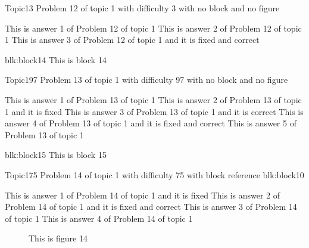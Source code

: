 \documentclass[master]{exam}
\begin{document}
\begin{problem}{Topic1}{3}
	Problem 12 of topic 1 with difficulty 3 with no block and no figure
	\begin{answers}
		\answer This is answer 1 of Problem 12 of topic 1 
		\answer This is answer 2 of Problem 12 of topic 1 
		 This is answer 3 of Problem 12 of topic 1 and it is fixed and correct
	\end{answers}
\end{problem}



\begin{block}{blk:block14}
This is block 14
\end{block}


\begin{problem}{Topic1}{97}
	Problem 13 of topic 1 with difficulty 97 with no block and no figure
	\begin{answers}
		\answer This is answer 1 of Problem 13 of topic 1 
		\answer[fixed] This is answer 2 of Problem 13 of topic 1 and it is fixed
		\answer[correct] This is answer 3 of Problem 13 of topic 1 and it is correct
		 This is answer 4 of Problem 13 of topic 1 and it is fixed and correct
		\answer This is answer 5 of Problem 13 of topic 1 
	\end{answers}
\end{problem}



\begin{block}{blk:block15}
This is block 15
\end{block}


\begin{problem}[requires=blk:block10]{Topic1}{75}
	Problem 14 of topic 1 with difficulty 75 with block reference blk:block10
	\begin{answers}
		\answer[fixed] This is answer 1 of Problem 14 of topic 1 and it is fixed
		 This is answer 2 of Problem 14 of topic 1 and it is fixed and correct
		\answer This is answer 3 of Problem 14 of topic 1 
		\answer This is answer 4 of Problem 14 of topic 1 
	\end{answers}
\end{problem}



\begin{figure}
	\begin{center}
		This is figure 14 
		\label{fig:figure14}
	\end{center}
\end{figure}
\end{document}
